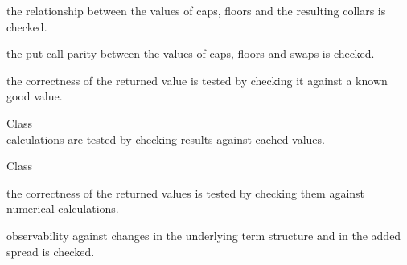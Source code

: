 \begin{DoxyRefList}
\begin{DoxyItemize}
\item the relationship between the values of caps, floors and the resulting collars is checked.
\item the put-\/call parity between the values of caps, floors and swaps is checked.
\item the correctness of the returned value is tested by checking it against a known good value. 
\end{DoxyItemize}
\item[Class \doxylink{class_quant_lib_1_1_zero_coupon_bond}{Quant\+Lib\+::Zero\+Coupon\+Bond} ]\hfill \\
\label{test__test000022}%
%
calculations are tested by checking results against cached values.  
\item[Class \doxylink{class_quant_lib_1_1_zero_spreaded_term_structure}{Quant\+Lib\+::Zero\+Spreaded\+Term\+Structure} ]\hfill \\
\label{test__test000168}%
%

\begin{DoxyItemize}
\item the correctness of the returned values is tested by checking them against numerical calculations.
\item observability against changes in the underlying term structure and in the added spread is checked. 
\end{DoxyItemize}
\end{DoxyRefList}